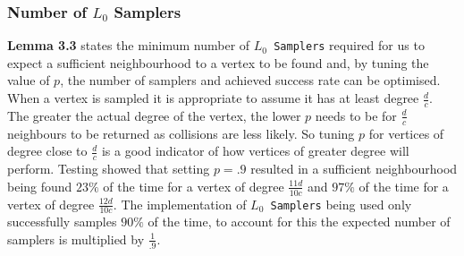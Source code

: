 \documentclass[11pt,twoside,a4paper]{report}
\begin{document}
\subsubsection{Number of $L_0$ Samplers}


\par \textbf{Lemma 3.3} states the minimum number of \texttt{$L_0$ Samplers} required for us to expect a sufficient neighbourhood to a vertex to be found and, by tuning the value of $p$, the number of samplers and achieved success rate can be optimised. When a vertex is sampled it is appropriate to assume it has at least degree $\frac{d}c$. The greater the actual degree of the vertex, the lower $p$ needs to be for $\frac{d}c$ neighbours to be returned as collisions are less likely. So tuning $p$ for vertices of degree close to $\frac{d}c$ is a good indicator of how vertices of greater degree will perform. Testing showed that setting $p=.9$ resulted in a sufficient neighbourhood being found $23\%$ of the time for a vertex of degree $\frac{11d}{10c}$ and $97\%$ of the time for a vertex of degree $\frac{12d}{10c}$. The implementation of \texttt{$L_0$ Samplers} being used only successfully samples $90\%$ of the time, to account for this the expected number of samplers is multiplied by $\frac{1}{.9}$.
\end{document}

